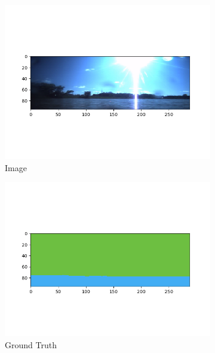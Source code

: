 \documentclass[10pt,twocolumn,letterpaper]{article}
\begin{document}
\begin{figure}[hpt]
\begin{center}
  
  	\begin{subfigure}{0.3\textwidth}
  		\includegraphics[width=\linewidth, trim={1.25cm 1.5cm 1.5cm 1.25cm},clip]{image4.png}
  		\caption{Image}
  	  \end{subfigure}
  	  \hfill
  	  \begin{subfigure}{0.3\textwidth}
  		\includegraphics[width=\linewidth,trim={1.25cm 1.5cm 1.5cm 1.25cm},clip]{gt4.png}
  		\caption{Ground Truth}
  	\end{subfigure}
  		\hfill
  	\begin{subfigure}{0.3\textwidth}

\end{subfigure}
\end{center}
\end{figure}
\end{document}
